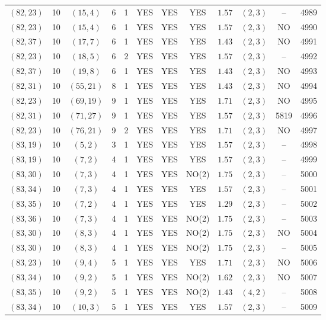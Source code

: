 \begin{longtable}{|c|c|c|c|c|c|c|c|c|c|c|c|}
$(82,23)$ & 10 & $(15,4)$ & 6 & 1 & YES & YES & YES & $1.57$ & $(2,3)$ & -- & 4989\\
$(82,23)$ & 10 & $(15,4)$ & 6 & 1 & YES & YES & YES & $1.57$ & $(2,3)$ & NO & 4990\\
$(82,37)$ & 10 & $(17,7)$ & 6 & 1 & YES & YES & YES & $1.43$ & $(2,3)$ & NO & 4991\\
$(82,23)$ & 10 & $(18,5)$ & 6 & 2 & YES & YES & YES & $1.57$ & $(2,3)$ & -- & 4992\\
$(82,37)$ & 10 & $(19,8)$ & 6 & 1 & YES & YES & YES & $1.43$ & $(2,3)$ & NO & 4993\\
$(82,31)$ & 10 & $(55,21)$ & 8 & 1 & YES & YES & YES & $1.43$ & $(2,3)$ & NO & 4994\\
$(82,23)$ & 10 & $(69,19)$ & 9 & 1 & YES & YES & YES & $1.71$ & $(2,3)$ & NO & 4995\\
$(82,31)$ & 10 & $(71,27)$ & 9 & 1 & YES & YES & YES & $1.57$ & $(2,3)$ & 5819 & 4996\\
$(82,23)$ & 10 & $(76,21)$ & 9 & 2 & YES & YES & YES & $1.71$ & $(2,3)$ & NO & 4997\\
$(83,19)$ & 10 & $(5,2)$ & 3 & 1 & YES & YES & YES & $1.57$ & $(2,3)$ & -- & 4998\\
$(83,19)$ & 10 & $(7,2)$ & 4 & 1 & YES & YES & YES & $1.57$ & $(2,3)$ & -- & 4999\\
$(83,30)$ & 10 & $(7,3)$ & 4 & 1 & YES & YES & NO(2) & $1.75$ & $(2,3)$ & -- & 5000\\
$(83,34)$ & 10 & $(7,3)$ & 4 & 1 & YES & YES & YES & $1.57$ & $(2,3)$ & -- & 5001\\
$(83,35)$ & 10 & $(7,2)$ & 4 & 1 & YES & YES & YES & $1.29$ & $(2,3)$ & -- & 5002\\
$(83,36)$ & 10 & $(7,3)$ & 4 & 1 & YES & YES & NO(2) & $1.75$ & $(2,3)$ & -- & 5003\\
$(83,30)$ & 10 & $(8,3)$ & 4 & 1 & YES & YES & NO(2) & $1.75$ & $(2,3)$ & NO & 5004\\
$(83,30)$ & 10 & $(8,3)$ & 4 & 1 & YES & YES & NO(2) & $1.75$ & $(2,3)$ & -- & 5005\\
$(83,23)$ & 10 & $(9,4)$ & 5 & 1 & YES & YES & YES & $1.71$ & $(2,3)$ & NO & 5006\\
$(83,34)$ & 10 & $(9,2)$ & 5 & 1 & YES & YES & NO(2) & $1.62$ & $(2,3)$ & NO & 5007\\
$(83,35)$ & 10 & $(9,2)$ & 5 & 1 & YES & YES & NO(2) & $1.43$ & $(4,2)$ & -- & 5008\\
$(83,34)$ & 10 & $(10,3)$ & 5 & 1 & YES & YES & YES & $1.57$ & $(2,3)$ & -- & 5009\\

\end{longtable}

